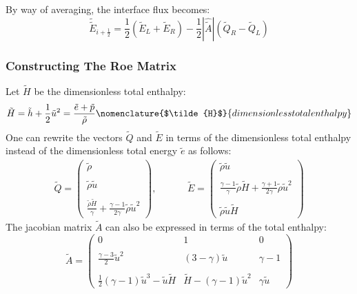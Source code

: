 \documentclass[11pt, a4paper]{article}
\begin{document}
By way of averaging, the interface flux becomes:
\begin{equation}
    \tilde{\tilde{E}}_{i+\frac{1}{2}}=\frac{1}{2}\left(\tilde{E}_L+\tilde{E}_R\right)-\frac{1}{2}\left|\hat{\tilde{A}}\right|\left(\tilde{Q}_R-\tilde{Q}_L\right)
\end{equation}

\subsubsection{Constructing The Roe Matrix}
Let $\tilde{H}$ be the dimensionless total enthalpy:
\begin{equation*}
    \tilde{H}=\tilde{h}+\frac{1}{2}\tilde{u}^2=\frac{\tilde{e}+\tilde{p}}{\tilde{\rho}}
    \nomenclature{$\tilde{H}$}{dimensionless total enthalpy}
\end{equation*}
One can rewrite the vectors $\tilde{Q}$ and $\tilde{E}$ in terms of the dimensionless total enthalpy instead of the dimensionless total energy $\tilde{e}$ as follows:
\begin{equation}
    \begin{matrix}
        \tilde{Q}=\begin{pmatrix}
            \tilde{\rho} \\\\
            \tilde{\rho}\tilde{u} \\\\
            \displaystyle\frac{\tilde{\rho}\tilde{H}}{\gamma}+\frac{\gamma-1}{2\gamma}\tilde{\rho}\tilde{u}^2
        \end{pmatrix},\hspace{1cm} & \tilde{E}=\begin{pmatrix}
            \tilde{\rho}\tilde{u} \\\\
            \displaystyle\frac{\gamma-1}{\gamma}\tilde{\rho}\tilde{H}+\frac{\gamma+1}{2\gamma}\tilde{\rho}\tilde{u}^2 \\\\
            \tilde{\rho}\tilde{u}\tilde{H}
        \end{pmatrix}
    \end{matrix}
\end{equation}
The jacobian matrix $\tilde{A}$ can also be expressed in terms of the total enthalpy:
\begin{equation}
    \tilde{A}=\begin{pmatrix}
        0 & 1 & 0 \\\\
        \displaystyle\frac{\gamma-3}{2}\tilde{u}^2 & \left(3-\gamma\right)\tilde{u} & \gamma-1 \\\\
        \displaystyle\frac{1}{2}\left(\gamma-1\right)\tilde{u}^3-\tilde{u}\tilde{H} & \tilde{H}-\left(\gamma-1\right)\tilde{u}^2 & \gamma\tilde{u}
    \end{pmatrix}
\end{equation}
\end{document}
